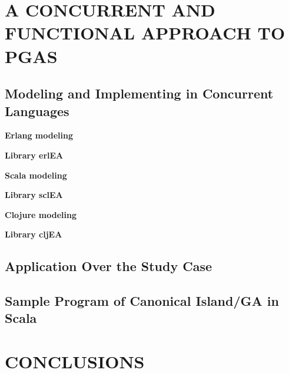 \documentclass[a4paper,twoside]{article}
\newcommand{\simpleEntry}[1]{
\vspace{.3cm}
\noindent \textbf{#1}
\vspace{.3cm}
}
\begin{document}
\section{\uppercase{A concurrent and functional approach to pGAs}}
\label{sec:design}
    

\subsection{Modeling and Implementing in Concurrent Languages}
\label{sec:impl}
    

\simpleEntry{Erlang modeling}
    

\simpleEntry{Library erlEA}
    

\simpleEntry{Scala modeling}
    

\simpleEntry{Library sclEA}
    

\simpleEntry{Clojure modeling}
    

\simpleEntry{Library cljEA}
    

\subsection{Application Over the Study Case} \label{sec:results}%
    

\subsection{Sample Program of Canonical Island/GA in Scala}\label{sec:sample}


\section{\uppercase{Conclusions}}
\label{sec:conclusions}
    


%


%
%

\vfill

{\small
}
\end{document}
